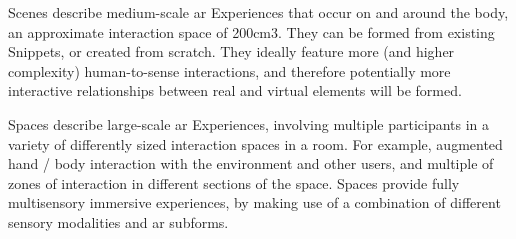 Scenes describe medium-scale \gls{ar} Experiences that occur on and around the body, an approximate interaction space of 200cm3. They can be formed from existing Snippets, or created from scratch. They ideally feature more (and higher complexity) human-to-sense interactions, and therefore potentially more interactive relationships between real and virtual elements will be formed.

Spaces describe large-scale \gls{ar} Experiences, involving multiple participants in a variety of differently sized interaction spaces in a room. For example, augmented hand / body interaction with the environment and other users, and multiple of zones of interaction in different sections of the space. Spaces provide fully multisensory immersive experiences, by making use of a combination of different sensory modalities and \gls{ar} subforms.






